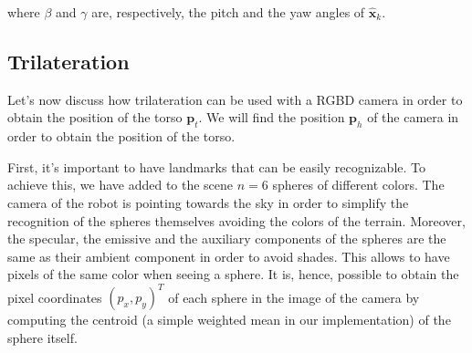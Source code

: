 \documentclass[a4paper]{article}
\begin{document}


\noindent where $\beta$ and $\gamma$ are, respectively,
the pitch and the yaw angles of $\bm{\hat{x}}_{k}$.

\subsection{Trilateration}
\label{subsec:trilateration}
Let's now discuss how
trilateration\cite{trilateration-hereman-1995} can be used with
a RGBD camera in order to obtain the position of the torso
$\bm{p}_t$. We will find the position $\bm{p}_h$ of the camera
in order to obtain the position of the torso.

First, it's important to have landmarks that can be
easily recognizable. To achieve this, we have added to the scene
$n=6$ spheres of different colors. The camera of the robot is
pointing towards the
sky in order to simplify the recognition of the spheres
themselves avoiding the colors of the terrain.
Moreover, the specular, the emissive and the auxiliary
components of the spheres are the same as their ambient component
in order to avoid shades. This allows to have pixels of the same
color when seeing a sphere. It is, hence, possible to obtain
the pixel coordinates $(p_x, p_y)^T$ of each sphere in the image
of the camera by computing the centroid (a simple weighted mean
in our implementation) of the sphere itself.
\end{document}
